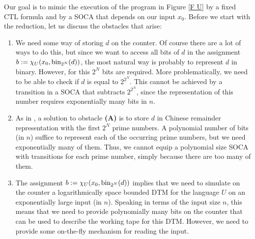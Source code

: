 \documentclass[times,envcountsame]{llncs}
\newcommand{\ctl}{\text{CTL}}
\begin{document}
\noindent
Our goal is to mimic the execution of the program in Figure \ref{F U} by
a fixed $\ctl$ formula and by a SOCA that depends on
our input $x_0$.
Before we start with the reduction, let us discuss the obstacles
that arise:


\begin{enumerate}[{\bf(A)}]
\item We need some way of storing $d$ on the counter. Of course
there are a lot of ways to do this, but since we want to access
all bits of $d$ in the assignment $b:=\chi_U(x_0,\text{bin}_{2^N}(d))$, the most
natural way is probably to represent $d$ in binary.
However, for this $2^N$ bits are required.
 More problematically, we need to be able to check if $d$ is equal to
$2^{2^N}$. This cannot be achieved by a transition in a SOCA
 that subtracts $2^{2^N}$, since the representation of this number
requires exponentially many bits in $n$.
\item As in \cite{GoLo10}, a solution to obstacle {\bf (A)} is to store $d$ in
Chinese remainder representation with the first $2^N$ prime numbers.
A polynomial number of bits (in $n$) suffice
to represent each of the occurring prime numbers, but
we need exponentially many of them.
Thus, we cannot equip a polynomial size SOCA with transitions for
each prime number, simply because there are too many of them.
\item
The assignment $b:=\chi_U(x_0,\text{bin}_{2^N}(d))$ implies that we need to simulate on
the counter a logarithmically space bounded DTM for the language $U$
on an exponentially
large input (in $n$).
Speaking in terms of the input size $n$, this means that we need to provide
polynomially many bits on the counter that can be used to describe the
working tape for this DTM. However, we need to provide
some on-the-fly mechanism for reading the input.
\end{enumerate}


\iffalse
\end{document}
